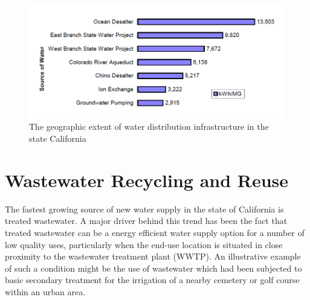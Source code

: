      \begin{figure}[The energy intensity of water distribution infrastructure in the state California]
       \centering
       \includegraphics[width=5.5in]{figures/energy-intensity.png}
       \caption[Energy Intensity of Water Distribution Infrastructure]{The geographic extent of water distribution infrastructure in the state California}
       \label{fig:infrastructure-energy-intensity}
     \end{figure}
    
\section{Wastewater Recycling and Reuse}
    
The fastest growing source of new water supply in the state of California is treated wastewater. A major driver behind this trend has been the fact that treated wastewater can be a energy efficient water supply option for a number of low quality uses, particularly when the end-use location is situated in close proximity to the wastewater treatment plant (WWTP). An illustrative example of such a condition might be the use of wastewater which had been subjected to basic secondary treatment for the irrigation of a nearby cemetery or golf course within an urban area.
    
